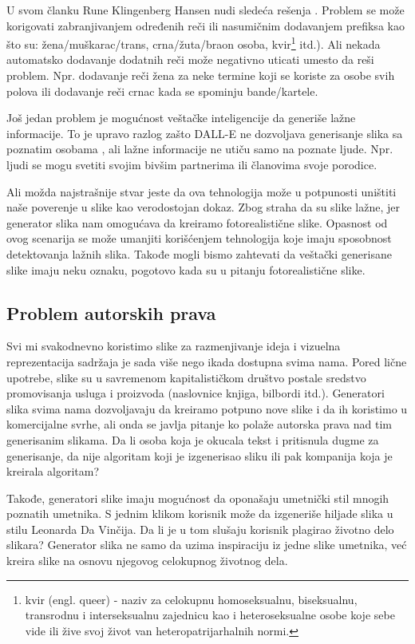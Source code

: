 \documentclass[12pt, letterpaper]{article}
\begin{document}
U svom članku Rune Klingenberg Hansen nudi sledeća rešenja \cite{kljuc1}. Problem se može korigovati zabranjivanjem određenih reči ili nasumičnim dodavanjem prefiksa kao što su: žena/muškarac/trans, crna/žuta/braon osoba, kvir\footnote{kvir (engl. queer) - naziv za celokupnu homoseksualnu, biseksualnu, transrodnu i interseksualnu zajednicu kao i heteroseksualne osobe koje sebe vide ili žive svoj život van heteropatrijarhalnih normi.} itd.). Ali nekada automatsko dodavanje dodatnih reči može negativno uticati umesto da reši problem. Npr. dodavanje reči žena za neke termine koji se koriste za osobe svih polova ili dodavanje reči crnac kada se spominju bande/kartele.

Još jedan problem je mogućnost veštačke inteligencije da generiše lažne informacije. To je upravo razlog zašto DALL-E \cite{dalle} ne dozvoljava generisanje slika sa poznatim osobama \cite{poznate}, ali lažne informacije ne utiču samo na poznate ljude. Npr. ljudi se mogu svetiti svojim bivšim partnerima ili članovima svoje porodice.

Ali možda najstrašnije stvar jeste da ova tehnologija može u potpunosti uništiti naše poverenje u slike kao verodostojan dokaz. Zbog straha da su slike lažne, jer generator slika nam omogućava da kreiramo fotorealistične slike. Opasnost od ovog scenarija se može umanjiti korišćenjem tehnologija koje imaju sposobnost detektovanja lažnih slika. Takođe mogli bismo zahtevati da veštački generisane slike imaju neku oznaku, pogotovo kada su u pitanju fotorealistične slike.



\subsection{Problem autorskih prava}

Svi mi svakodnevno koristimo slike za razmenjivanje ideja i vizuelna reprezentacija sadržaja je sada više nego ikada dostupna svima nama. Pored lične upotrebe, slike su u savremenom kapitalističkom društvo postale sredstvo promovisanja usluga i proizvoda (naslovnice knjiga, bilbordi itd.). Generatori slika svima nama dozvoljavaju da kreiramo potpuno nove slike i da ih koristimo u komercijalne svrhe, ali onda se javlja pitanje ko polaže autorska prava nad tim generisanim slikama. Da li osoba koja je okucala tekst i pritisnula dugme za generisanje, da nije algoritam koji je izgenerisao sliku ili pak kompanija koja je kreirala algoritam?

Takođe, generatori slike imaju mogućnost da oponašaju umetnički stil mnogih poznatih umetnika. S jednim klikom korisnik može da izgeneriše hiljade slika u stilu Leonarda Da Vinčija. Da li je u tom slušaju korisnik plagirao životno delo slikara? Generator slika ne samo da uzima inspiraciju iz jedne slike umetnika, već kreira slike na osnovu njegovog celokupnog životnog dela.
\end{document}
